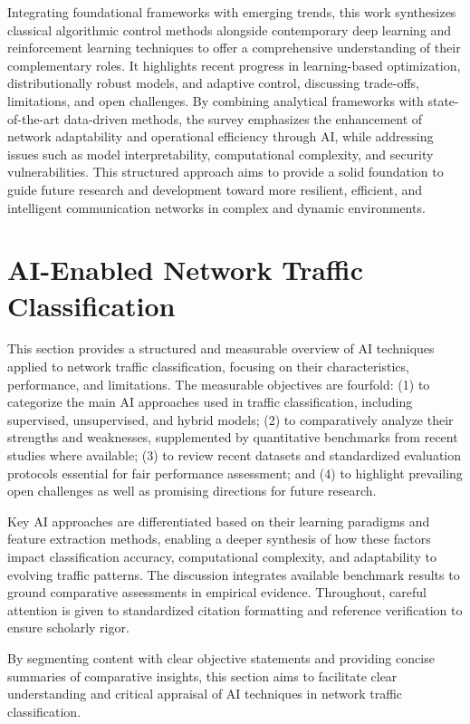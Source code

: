 \documentclass[sigconf]{acmart}
\begin{document}
Integrating foundational frameworks with emerging trends, this work synthesizes classical algorithmic control methods alongside contemporary deep learning and reinforcement learning techniques to offer a comprehensive understanding of their complementary roles. It highlights recent progress in learning-based optimization, distributionally robust models, and adaptive control, discussing trade-offs, limitations, and open challenges. By combining analytical frameworks with state-of-the-art data-driven methods, the survey emphasizes the enhancement of network adaptability and operational efficiency through AI, while addressing issues such as model interpretability, computational complexity, and security vulnerabilities. This structured approach aims to provide a solid foundation to guide future research and development toward more resilient, efficient, and intelligent communication networks in complex and dynamic environments.

\section{AI-Enabled Network Traffic Classification}

This section provides a structured and measurable overview of AI techniques applied to network traffic classification, focusing on their characteristics, performance, and limitations. The measurable objectives are fourfold: (1) to categorize the main AI approaches used in traffic classification, including supervised, unsupervised, and hybrid models; (2) to comparatively analyze their strengths and weaknesses, supplemented by quantitative benchmarks from recent studies where available; (3) to review recent datasets and standardized evaluation protocols essential for fair performance assessment; and (4) to highlight prevailing open challenges as well as promising directions for future research.

Key AI approaches are differentiated based on their learning paradigms and feature extraction methods, enabling a deeper synthesis of how these factors impact classification accuracy, computational complexity, and adaptability to evolving traffic patterns. The discussion integrates available benchmark results to ground comparative assessments in empirical evidence. Throughout, careful attention is given to standardized citation formatting and reference verification to ensure scholarly rigor.

By segmenting content with clear objective statements and providing concise summaries of comparative insights, this section aims to facilitate clear understanding and critical appraisal of AI techniques in network traffic classification.
\end{document}
